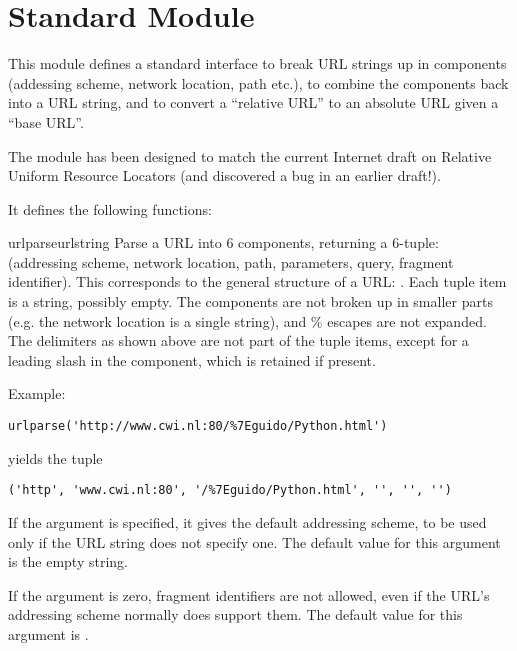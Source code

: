 \section{Standard Module }
\label{module-urlparse}

\renewcommand{\indexsubitem}{(in module urlparse)}

This module defines a standard interface to break URL strings up in
components (addessing scheme, network location, path etc.), to combine
the components back into a URL string, and to convert a ``relative
URL'' to an absolute URL given a ``base URL''.

The module has been designed to match the current Internet draft on
Relative Uniform Resource Locators (and discovered a bug in an earlier
draft!).

It defines the following functions:

\begin{funcdesc}{urlparse}{urlstring}
Parse a URL into 6 components, returning a 6-tuple: (addressing
scheme, network location, path, parameters, query, fragment
identifier).  This corresponds to the general structure of a URL:
.
Each tuple item is a string, possibly empty.
The components are not broken up in smaller parts (e.g. the network
location is a single string), and \% escapes are not expanded.
The delimiters as shown above are not part of the tuple items,
except for a leading slash in the  component, which is
retained if present.

Example:

\bcode\begin{verbatim}
urlparse('http://www.cwi.nl:80/%7Eguido/Python.html')
\end{verbatim}\ecode
%
yields the tuple

\bcode\begin{verbatim}
('http', 'www.cwi.nl:80', '/%7Eguido/Python.html', '', '', '')
\end{verbatim}\ecode
%
If the  argument is specified, it gives the
default addressing scheme, to be used only if the URL string does not
specify one.  The default value for this argument is the empty string.

If the  argument is zero, fragment identifiers
are not allowed, even if the URL's addressing scheme normally does
support them.  The default value for this argument is .
\end{funcdesc}


